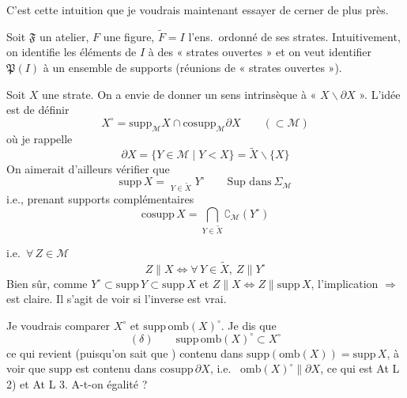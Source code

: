 \documentclass[11pt,a4paper]{article}
\begin{document}
C'est cette intuition que je voudrais maintenant essayer de cerner de plus près.

Soit $\mathfrak{F}$ un atelier, $F$ une figure, $\widetilde{F} = I$ l'ens.\ ordonné de ses strates.  Intuitivement, on identifie les éléments de $I$ à des « strates ouvertes » et on veut identifier $\mathfrak{P}(I)$ à  un ensemble de supports (réunions de « strates ouvertes »).

Soit $X$ une strate. On a envie de donner un sens intrinsèque à « $X \smallsetminus \partial X$ ». L'idée est de  définir
\[
  X^{\circ} = \mathrm{supp}_{\mathcal{M}} X \cap \mathrm{cosupp}_{\mathcal{M}} \partial X \qquad (\subset \mathcal{M})
\]
où je rappelle
\[
  \partial X = \lbrace Y \in \mathcal{M} \mid Y < X \rbrace = \widetilde{X} \smallsetminus \lbrace X \rbrace
\]
On aimerait d'ailleurs vérifier que
\[
  \mathrm{supp}\, X = \mathop{\mathrm{Sup}_{\Sigma}}_{Y \in \widetilde{X}} Y^{\circ} \qquad \text{Sup dans}\ \Sigma_{\mathcal{M}}
\]
i.e., prenant  supports complémentaires
\[
  \mathrm{cosupp}\, X = \bigcap_{Y \in \widetilde{X}} \complement_{\mathcal{M}}(Y^{\circ})
\]

i.e.\ $\forall\, Z \in \mathcal{M}$
\[
  Z \parallel X \Longleftrightarrow \forall\, Y \in \widetilde{X},\ Z \parallel Y^{\circ}
\]
Bien sûr, comme $Y^{\circ} \subset \mathrm{supp}\, Y \subset \mathrm{supp}\, X$ et $Z \parallel X \Leftrightarrow Z \parallel \mathrm{supp}\, X$, l'implication $\Longrightarrow$ est claire.  Il s'agit de voir si l'inverse est vrai. 



Je voudrais comparer $X^{\circ}$ et $\mathrm{supp}\, \mathrm{omb}(X)^{\circ}$. Je dis que
\[
  (\delta) \qquad \mathrm{supp}\, \mathrm{omb}(X)^{\circ} \subset X^{\circ}
\]
ce qui revient (puisqu'on sait  que  \ill{}) contenu dans $\mathrm{supp}(\mathrm{omb}(X)) = \mathrm{supp}\, X$, à voir que $\mathrm{supp}$ est contenu dans $\mathrm{cosupp}\, \partial X$, i.e.\  $\mathrm{omb}(X)^{\circ} \parallel \partial X$, ce qui  est At L 2) et At L 3.  A-t-on égalité ?
\end{document}
